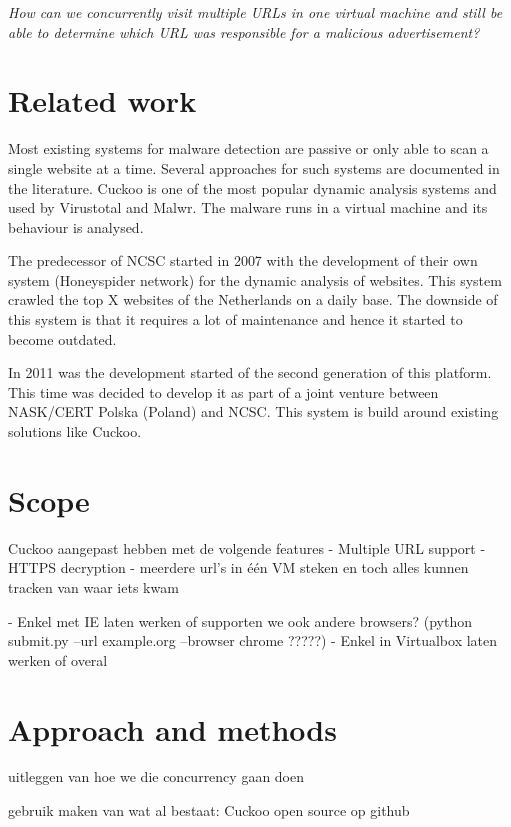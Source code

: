\documentclass{scrartcl}
\begin{document}
\textit{How can we concurrently visit multiple URLs in one virtual machine and still be able to determine which URL was responsible for a malicious advertisement?}

\section{Related work}

Most existing systems for malware detection are passive or only able to scan a single website at a time. Several approaches for such systems are documented\cite{auto_malware} in the literature\cite{}. Cuckoo is one of the most popular dynamic analysis systems and used by Virustotal and Malwr. The malware runs in a virtual machine and its behaviour is analysed.

The predecessor of NCSC started in 2007 with the development of their own system (Honeyspider network) for the dynamic analysis of websites. This system crawled the top X websites of the Netherlands on a daily base. The downside of this system is that it requires a lot of maintenance and hence it started to become outdated.

In 2011 was the development started of the second generation of this platform. This time was decided to develop it as part of a joint venture between NASK/CERT Polska (Poland) and NCSC. This system is build around existing solutions like Cuckoo.

\section{Scope}

	Cuckoo aangepast hebben met de volgende features
		- Multiple URL support
		- HTTPS decryption
		- meerdere url's in één VM steken en toch alles kunnen tracken van waar iets kwam


 - Enkel met IE laten werken of supporten we ook andere browsers?
	(python submit.py --url example.org --browser chrome ?????)
 - Enkel in Virtualbox laten werken of overal


\section{Approach and methods}

uitleggen van hoe we die concurrency gaan doen

gebruik maken van wat al bestaat: Cuckoo
open source op github
\end{document}
